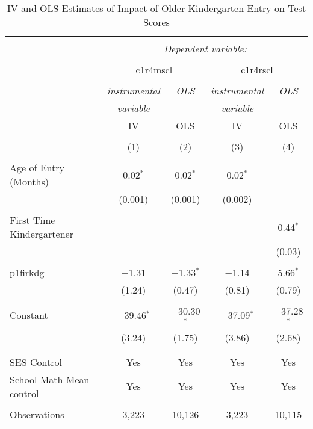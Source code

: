 
\begin{table}[!htbp] \centering 
  \caption{IV and OLS Estimates of Impact of Older Kindergarten Entry on Test Scores} 
  \label{} 
\begin{tabular}{@{\extracolsep{5pt}}lcccc} 
\\[-1.8ex]\hline 
\hline \\[-1.8ex] 
 & \multicolumn{4}{c}{\textit{Dependent variable:}} \\ 
\cline{2-5} 
\\[-1.8ex] & \multicolumn{2}{c}{c1r4mscl} & \multicolumn{2}{c}{c1r4rscl} \\ 
\\[-1.8ex] & \textit{instrumental} & \textit{OLS} & \textit{instrumental} & \textit{OLS} \\ 
 & \textit{variable} & \textit{} & \textit{variable} & \textit{} \\ 
 & IV & OLS & IV & OLS \\ 
\\[-1.8ex] & (1) & (2) & (3) & (4)\\ 
\hline \\[-1.8ex] 
 Age of Entry (Months) & 0.02$^{*}$ & 0.02$^{*}$ & 0.02$^{*}$ &  \\ 
  & (0.001) & (0.001) & (0.002) &  \\ 
  & & & & \\ 
 First Time Kindergartener &  &  &  & 0.44$^{*}$ \\ 
  &  &  &  & (0.03) \\ 
  & & & & \\ 
 p1firkdg & $-$1.31 & $-$1.33$^{*}$ & $-$1.14 & 5.66$^{*}$ \\ 
  & (1.24) & (0.47) & (0.81) & (0.79) \\ 
  & & & & \\ 
 Constant & $-$39.46$^{*}$ & $-$30.30$^{*}$ & $-$37.09$^{*}$ & $-$37.28$^{*}$ \\ 
  & (3.24) & (1.75) & (3.86) & (2.68) \\ 
  & & & & \\ 
\hline \\[-1.8ex] 
SES Control & Yes & Yes & Yes & Yes \\ 
School Math Mean control & Yes & Yes & Yes & Yes \\ 
\hline &  &  &  &  \\ 
Observations & 3,223 & 10,126 & 3,223 & 10,115 \\ 

\end{tabular}
\end{table}
